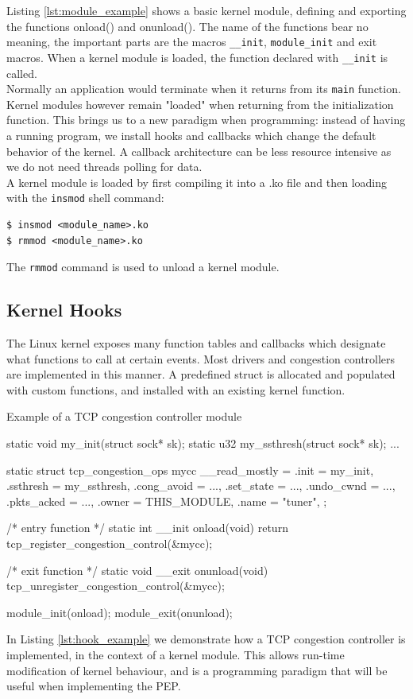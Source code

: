 \documentclass[a4paper,english, 12pt]{report}
\begin{document}
Listing \ref{lst:module_example} shows a basic kernel module, defining and exporting the functions onload() and onunload(). The name of the functions bear no meaning, the important parts are the macros \verb|__init|, \verb|module_init| and exit macros\cite{lkm}. When a kernel module is loaded, the function declared with \verb|__init| is called.\\

Normally an application would terminate when it returns from its \verb|main| function. Kernel modules however remain "loaded" when returning from the initialization function. This brings us to a new paradigm when programming: instead of having a running program, we install hooks and callbacks which change the default behavior of the kernel. A callback architecture can be less resource intensive as we do not need threads polling for data.\\

A kernel module is loaded by first compiling it into a .ko file and then loading with the \verb|insmod| shell command:
\begin{verbatim}
$ insmod <module_name>.ko
$ rmmod <module_name>.ko
\end{verbatim}
The \verb|rmmod| command is used to unload a kernel module. 

\subsection{Kernel Hooks}
The Linux kernel exposes many function tables and callbacks which designate what functions to call at certain events. Most drivers and congestion controllers are implemented in this manner. A predefined struct is allocated and populated with custom functions, and installed with an existing kernel function.

\begin{autonumlstlisting}[label=lst:hook_example]{Example of a TCP congestion controller module}

static void my_init(struct sock* sk);
static u32 my_ssthresh(struct sock* sk);
...

static struct tcp_congestion_ops mycc __read_mostly = {
  .init           = my_init,
  .ssthresh       = my_ssthresh,
  .cong_avoid     = ...,
  .set_state      = ...,
  .undo_cwnd      = ...,
  .pkts_acked     = ...,
  .owner          = THIS_MODULE,
  .name           = "tuner",
};

/* entry function */
static int __init onload(void) {
    return tcp_register_congestion_control(&mycc);
}

/* exit function */
static void __exit onunload(void) {
    tcp_unregister_congestion_control(&mycc);
}

module_init(onload);
module_exit(onunload);
\end{autonumlstlisting}
In Listing \ref{lst:hook_example} we demonstrate how a TCP congestion controller is implemented, in the context of a kernel module. This allows run-time modification of kernel behaviour, and is a programming paradigm that will be useful when implementing the PEP.
\end{document}
